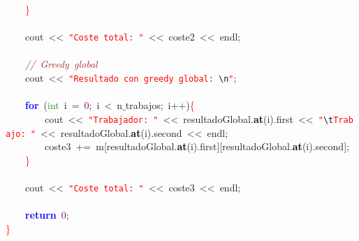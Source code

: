 \mbox{}\ \ \ \ \textcolor{Red}{\}} \\
\mbox{} \\
\mbox{}\ \ \ \ cout\ \textcolor{BrickRed}{\textless{}\textless{}}\ \texttt{\textcolor{Red}{"{}Coste\ total:\ "{}}}\ \textcolor{BrickRed}{\textless{}\textless{}}\ coste2\ \textcolor{BrickRed}{\textless{}\textless{}}\ endl\textcolor{BrickRed}{;} \\
\mbox{} \\
\mbox{}\ \ \ \ \textit{\textcolor{Brown}{//\ Greedy\ global}} \\
\mbox{}\ \ \ \ cout\ \textcolor{BrickRed}{\textless{}\textless{}}\ \texttt{\textcolor{Red}{"{}Resultado\ con\ greedy\ global:\ }}\texttt{\textcolor{CarnationPink}{\textbackslash{}n}}\texttt{\textcolor{Red}{"{}}}\textcolor{BrickRed}{;}\  \\
\mbox{} \\
\mbox{}\ \ \ \ \textbf{\textcolor{Blue}{for}}\ \textcolor{BrickRed}{(}\textcolor{ForestGreen}{int}\ i\ \textcolor{BrickRed}{=}\ \textcolor{Purple}{0}\textcolor{BrickRed}{;}\ i\ \textcolor{BrickRed}{\textless{}}\ n$\_$trabajos\textcolor{BrickRed}{;}\ i\textcolor{BrickRed}{++)}\textcolor{Red}{\{} \\
\mbox{}\ \ \ \ \ \ \ \ cout\ \textcolor{BrickRed}{\textless{}\textless{}}\ \texttt{\textcolor{Red}{"{}Trabajador:\ "{}}}\ \textcolor{BrickRed}{\textless{}\textless{}}\ resultadoGlobal\textcolor{BrickRed}{.}\textbf{\textcolor{Black}{at}}\textcolor{BrickRed}{(}i\textcolor{BrickRed}{).}first\ \textcolor{BrickRed}{\textless{}\textless{}}\ \texttt{\textcolor{Red}{"{}}}\texttt{\textcolor{CarnationPink}{\textbackslash{}t}}\texttt{\textcolor{Red}{Trabajo:\ "{}}}\ \textcolor{BrickRed}{\textless{}\textless{}}\ resultadoGlobal\textcolor{BrickRed}{.}\textbf{\textcolor{Black}{at}}\textcolor{BrickRed}{(}i\textcolor{BrickRed}{).}second\ \textcolor{BrickRed}{\textless{}\textless{}}\ endl\textcolor{BrickRed}{;}\  \\
\mbox{}\ \ \ \ \ \ \ \ coste3\ \textcolor{BrickRed}{+=}\ m\textcolor{BrickRed}{[}resultadoGlobal\textcolor{BrickRed}{.}\textbf{\textcolor{Black}{at}}\textcolor{BrickRed}{(}i\textcolor{BrickRed}{).}first\textcolor{BrickRed}{][}resultadoGlobal\textcolor{BrickRed}{.}\textbf{\textcolor{Black}{at}}\textcolor{BrickRed}{(}i\textcolor{BrickRed}{).}second\textcolor{BrickRed}{];}\  \\
\mbox{}\ \ \ \ \textcolor{Red}{\}} \\
\mbox{}\ \ \ \  \\
\mbox{}\ \ \ \ cout\ \textcolor{BrickRed}{\textless{}\textless{}}\ \texttt{\textcolor{Red}{"{}Coste\ total:\ "{}}}\ \textcolor{BrickRed}{\textless{}\textless{}}\ coste3\ \textcolor{BrickRed}{\textless{}\textless{}}\ endl\textcolor{BrickRed}{;}\ \ \ \ \ \ \ \ \ \ \ \ \  \\
\mbox{} \\
\mbox{}\ \ \ \ \textbf{\textcolor{Blue}{return}}\ \textcolor{Purple}{0}\textcolor{BrickRed}{;}\  \\
\mbox{}\textcolor{Red}{\}} \\
\mbox{}

